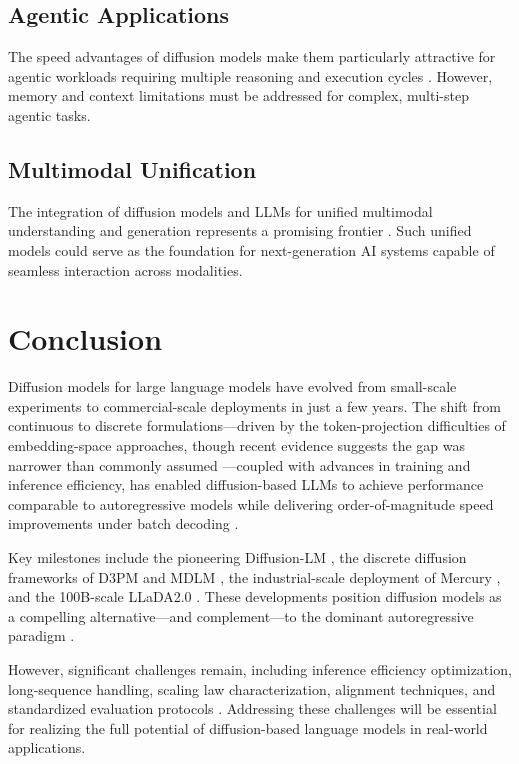 \documentclass[11pt]{article}
\begin{document}
\subsection{Agentic Applications}

The speed advantages of diffusion models make them particularly attractive for agentic workloads requiring multiple reasoning and execution cycles \cite{khanna2025mercury}. However, memory and context limitations must be addressed for complex, multi-step agentic tasks.

\subsection{Multimodal Unification}

The integration of diffusion models and LLMs for unified multimodal understanding and generation represents a promising frontier \cite{benjdira2025integrating, khanna2025mercury}. Such unified models could serve as the foundation for next-generation AI systems capable of seamless interaction across modalities.

\section{Conclusion}

Diffusion models for large language models have evolved from small-scale experiments to commercial-scale deployments in just a few years. The shift from continuous to discrete formulations---driven by the token-projection difficulties of embedding-space approaches, though recent evidence suggests the gap was narrower than commonly assumed \cite{shen2026codar}---coupled with advances in training and inference efficiency, has enabled diffusion-based LLMs to achieve performance comparable to autoregressive models while delivering order-of-magnitude speed improvements under batch decoding \cite{yu2025discrete, wang2025d2f}.

Key milestones include the pioneering Diffusion-LM \cite{li2022diffusion}, the discrete diffusion frameworks of D3PM \cite{austin2021d3pm} and MDLM \cite{sahoo2024simple}, the industrial-scale deployment of Mercury \cite{khanna2025mercury}, and the 100B-scale LLaDA2.0 \cite{nie2025large}. These developments position diffusion models as a compelling alternative---and complement---to the dominant autoregressive paradigm \cite{yu2025discrete}.

However, significant challenges remain, including inference efficiency optimization, long-sequence handling, scaling law characterization, alignment techniques, and standardized evaluation protocols \cite{tseng2025diffusion, li2025surveydlm}. Addressing these challenges will be essential for realizing the full potential of diffusion-based language models in real-world applications.
\end{document}

